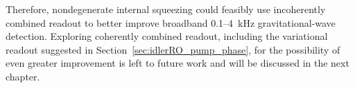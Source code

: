 Therefore, nondegenerate internal squeezing could feasibly use incoherently combined readout to better improve broadband 0.1--4~kHz gravitational-wave detection. %
Exploring coherently combined readout, including the variational readout suggested in Section~\ref{sec:idlerRO_pump_phase}, for the possibility of even greater improvement is left to future work and will be discussed in the next chapter. %



